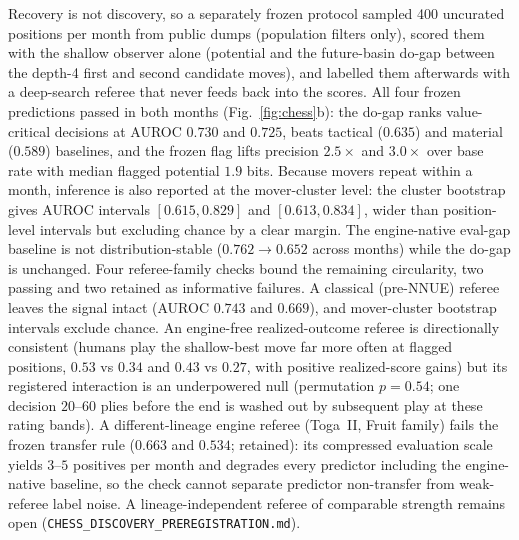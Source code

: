 \documentclass[11pt]{article}
\theoremstyle{definition}
\begin{document}
Recovery is not discovery, so a separately frozen protocol sampled 400
uncurated positions per month from public dumps (population filters
only), scored them with the shallow observer alone (potential and the
future-basin do-gap between the depth-4 first and second candidate
moves), and labelled them afterwards with a deep-search referee that
never feeds back into the scores. All four frozen predictions passed
in both months (Fig.~\ref{fig:chess}b): the do-gap ranks
value-critical decisions at AUROC $0.730$ and $0.725$, beats tactical
($0.635$) and material ($0.589$) baselines, and the frozen flag lifts
precision $2.5\times$ and $3.0\times$ over base rate with median
flagged potential $1.9$ bits. Because movers repeat within a month,
inference is also reported at the mover-cluster level: the cluster
bootstrap gives AUROC intervals $[0.615, 0.829]$ and $[0.613, 0.834]$,
wider than position-level intervals but excluding chance by a clear
margin. The engine-native eval-gap baseline is
not distribution-stable ($0.762\to0.652$ across months) while the
do-gap is unchanged. Four referee-family checks bound the remaining
circularity, two passing and two retained as informative failures. A
classical (pre-NNUE) referee leaves the signal intact (AUROC $0.743$
and $0.669$), and mover-cluster bootstrap intervals exclude chance. An
engine-free realized-outcome referee is directionally consistent
(humans play the shallow-best move far more often at flagged
positions, $0.53$ vs $0.34$ and $0.43$ vs $0.27$, with positive
realized-score gains) but its registered interaction is an
underpowered null (permutation $p=0.54$; one decision $20$--$60$ plies
before the end is washed out by subsequent play at these rating
bands). A different-lineage engine referee (Toga~II, Fruit family)
fails the frozen transfer rule ($0.663$ and $0.534$; retained): its
compressed evaluation scale yields $3$--$5$ positives per month and
degrades every predictor including the engine-native baseline, so the
check cannot separate predictor non-transfer from weak-referee label
noise. A lineage-independent referee of comparable strength remains
open (\texttt{CHESS\_DISCOVERY\_PREREGISTRATION.md}).
\end{document}
